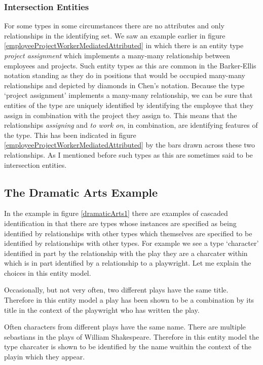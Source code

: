 \subsubsection{Intersection Entities}
\mynote {}
For some types in some circumstances there are no attributes and only relationships in the identifying set. 
We saw an example earlier
in figure \ref{employeeProjectWorkerMediatedAttributed} in  which there is an entity type
\textit{project assignment} which implements a many-many relationship between employees and projects. 
Such entity types as this are common in the Barker-Ellis notation 
standing as they do in positions that would be occupied many-many relationships
 and depicted by  diamonds in Chen's notation. 
 Because the type `project assignment' implements a many-many relationship, we can be sure that entities of the type  are uniquely identified by 
 identifying the employee that they assign in combination with the project they assign to. This means that the relationships \textit{assigning} and \textit{to work on}, in combination, are identifying features of the type. This has been indicated in 
figure  \ref{employeeProjectWorkerMediatedAttributed} by the bars drawn across these two relationships. As I mentioned before such types as this are sometimes said to be intersection entities.


\subsection{The Dramatic Arts Example}
\label{DramaticArtsExample}
In the example in figure \ref{dramaticArts1} there are examples of cascaded identification in that there are types whose instances are specified as being identified by relationships with other types which themselves are specified to be identified by relationships with other types.
For example we see a type `character' identified in part by the relationship with the play they are a charcater within which is in part identified by a relationship to a playwright. 
Let me explain the choices in this entity model.


Occasionally, but not very often, two different plays have the same title. Therefore in this entity model a play has been shown to be a combination by its title in the context of the playwright who has written the play. 

Often characters from different plays have the same name. There are multiple sebastians in the plays of William Shakespeare. Therefore in this entity model the type charcater is shown to be identified by the name wuithin the context of the playin which they appear.

